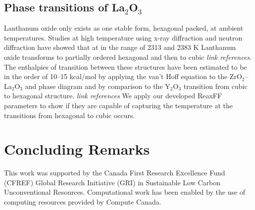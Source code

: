 \documentclass[journal=jpcafh,manuscript=article]{achemso}
\begin{document}
\subsection{Phase transitions of La$_2$O$_3$}

Lanthanum oxide only exists as one stable form, hexagonal packed, at ambient temperatures.
Studies at high temperature using x-ray diffraction and neutron diffraction have showed that at in the range of 2313 and 2383 K Lanthanum oxide transforms to partially ordered hexagonal and then to cubic \emph{link references}.
The enthalpies of transition between these structures have been estimated to be in the order of 10--15 kcal/mol by applying the van't Hoff equation to the ZrO$_2$--La$_2$O$_3$ and phase diagram and by comparison to the Y$_2$O$_3$ transition from cubic to hexagonal structure. \emph{link references}
We apply our developed ReaxFF parameters to show if they are capable of capturing the temperature at the transitions from hexagonal to cubic occurs.

\section{Concluding Remarks}
\label{sec:conclusions}


\begin{acknowledgement}
This work was supported by the Canada First Research Excellence Fund (CFREF) Global Research Initiative (GRI) in Sustainable Low Carbon Unconventional Resources.
Computational work has been enabled by the use of computing resources provided by Compute Canada.
\end{acknowledgement}

\pagebreak
\end{document}
